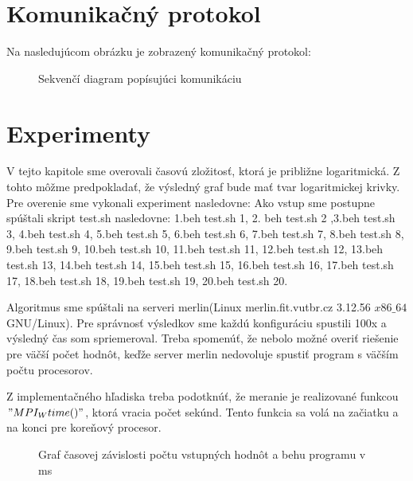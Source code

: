 \documentclass[11pt,a4paper,titlepage,final]{article}
\begin{document}
\section{Komunikačný protokol}
Na nasledujúcom obrázku je zobrazený komunikačný protokol:
 \begin{figure}[h]

\begin{center}
\caption{Sekvenčí diagram popísujúci komunikáciu}
\end{center}

\end{figure}


\section{Experimenty}
V tejto kapitole sme overovali časovú zložitosť, ktorá je približne logaritmická. Z tohto môžme predpokladať, že výsledný graf bude mať tvar logaritmickej krivky. Pre overenie sme vykonali experiment nasledovne: Ako vstup sme postupne spúštali skript test.sh nasledovne: 1.beh test.sh 1, 2. beh test.sh 2 ,3.beh test.sh 3, 4.beh test.sh 4, 5.beh test.sh 5, 6.beh test.sh 6, 7.beh test.sh 7, 8.beh test.sh 8, 9.beh test.sh 9, 10.beh test.sh 10, 11.beh test.sh 11, 12.beh test.sh 12, 13.beh test.sh 13, 14.beh test.sh 14, 15.beh test.sh 15, 16.beh test.sh 16, 17.beh test.sh 17, 18.beh test.sh 18, 19.beh test.sh 19, 20.beh test.sh 20.

Algoritmus sme spúštali na serveri merlin(Linux merlin.fit.vutbr.cz 3.12.56 $x86\_64$ GNU/Linux). Pre správnosť výsledkov sme každú konfiguráciu spustili 100x a výsledný čas som spriemeroval. Treba spomenúť, že nebolo možné overiť riešenie pre väčší počet hodnôt, keďže server merlin nedovoluje spustiť program s väčším počtu procesorov.

Z implementačného hľadiska treba podotknúť, že meranie je realizované funkcou $"MPI_Wtime()"$, ktorá vracia počet sekúnd. Tento funkcia sa volá na začiatku a na konci pre koreňový procesor.
 \begin{figure}[h]

\begin{center}
\caption{Graf časovej závislosti počtu vstupných hodnôt a behu programu v ms}
\end{center}

\end{figure}
\end{document}
